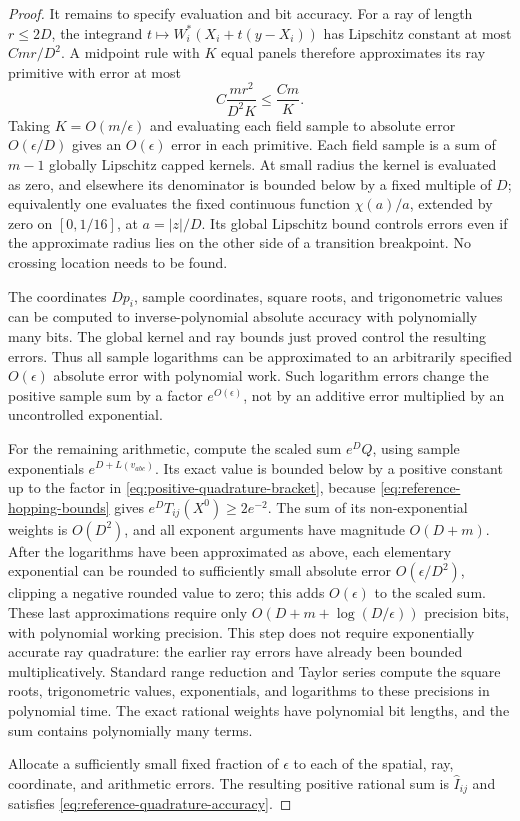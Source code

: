 \begin{proof}
It remains to specify evaluation and bit accuracy.  For a ray of
length $r\le2D$, the integrand
$t\mapsto W_i^*(X_i+t(y-X_i))$ has Lipschitz constant
at most $Cmr/D^2$.  A midpoint rule with $K$ equal panels
therefore approximates its ray primitive with error at most
\begin{equation}
 C\frac{mr^2}{D^2K}\le\frac{Cm}{K}.
 \label{eq:ray-quadrature-error}
\end{equation}
Taking $K=O(m/\epsilon)$ and evaluating each field sample to
absolute error $O(\epsilon/D)$ gives an $O(\epsilon)$ error
in each primitive.  Each field sample is a sum of $m-1$
globally Lipschitz capped kernels.  At small radius the kernel
is evaluated as zero, and elsewhere its denominator is bounded
below by a fixed multiple of $D$; equivalently one evaluates the
fixed continuous function $\chi(a)/a$, extended by zero on
$[0,1/16]$, at $a=|z|/D$.  Its global Lipschitz bound controls
errors even if the approximate radius lies on the other side of
a transition breakpoint.  No crossing location needs to be found.

The coordinates $Dp_i$, sample coordinates, square roots, and
trigonometric values can be computed to inverse-polynomial
absolute accuracy with polynomially many bits.  The global
kernel and ray bounds just proved control the resulting errors.
Thus all sample logarithms can be approximated to an arbitrarily
specified $O(\epsilon)$ absolute error with polynomial work.
Such logarithm errors change the positive sample sum by a factor
$e^{O(\epsilon)}$, not by an additive error multiplied by
an uncontrolled exponential.

For the remaining arithmetic, compute the scaled sum $e^D Q$,
using sample exponentials $e^{D+L(v_{abc})}$.  Its exact value
is bounded below by a positive constant up to the factor in
\eqref{eq:positive-quadrature-bracket}, because
\eqref{eq:reference-hopping-bounds} gives
$e^D T_{ij}(X^0)\ge2e^{-2}$.  The sum of its non-exponential
weights is $O(D^2)$, and all exponent arguments have magnitude
$O(D+m)$.  After the logarithms have been approximated as above,
each elementary exponential can be rounded to sufficiently small
absolute error $O(\epsilon/D^2)$, clipping a negative rounded
value to zero; this adds $O(\epsilon)$ to the scaled sum.  These
last approximations require only
$O(D+m+\log(D/\epsilon))$ precision bits, with polynomial
working precision.  This step does not require exponentially
accurate ray quadrature: the earlier ray errors have already
been bounded multiplicatively.  Standard range reduction and
Taylor series compute the square roots, trigonometric values,
exponentials, and logarithms to these precisions in polynomial
time.  The exact rational weights have polynomial bit lengths,
and the sum contains polynomially many terms.

Allocate a sufficiently small fixed fraction of $\epsilon$ to
each of the spatial, ray, coordinate, and arithmetic errors.
The resulting positive rational sum is $\widehat I_{ij}$ and
satisfies \eqref{eq:reference-quadrature-accuracy}.
\end{proof}

